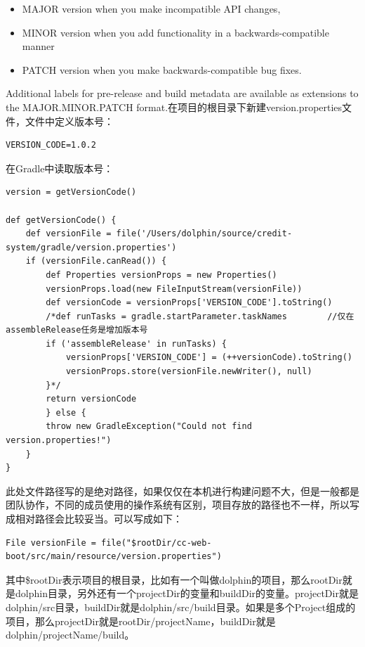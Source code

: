 \documentclass[12pt]{book}
\numberwithin{dummy}{section}
\theoremstyle{ocrenumbox}
\theoremstyle{blacknumex}
\theoremstyle{blacknumbox}
\theoremstyle{ocrenum}
\begin{document}
\begin{itemize}
	\item{MAJOR version when you make incompatible API changes,}
	\item{MINOR version when you add functionality in a backwards-compatible manner}
	\item{PATCH version when you make backwards-compatible bug fixes.}
\end{itemize}

Additional labels for pre-release and build metadata are available as extensions to the MAJOR.MINOR.PATCH format.在项目的根目录下新建version.properties文件，文件中定义版本号：

\begin{lstlisting}
VERSION_CODE=1.0.2
\end{lstlisting}

在Gradle中读取版本号：

\begin{lstlisting}
version = getVersionCode()

def getVersionCode() {
	def versionFile = file('/Users/dolphin/source/credit-system/gradle/version.properties')
	if (versionFile.canRead()) {
		def Properties versionProps = new Properties()
		versionProps.load(new FileInputStream(versionFile))
		def versionCode = versionProps['VERSION_CODE'].toString()
		/*def runTasks = gradle.startParameter.taskNames        //仅在assembleRelease任务是增加版本号
		if ('assembleRelease' in runTasks) {
			versionProps['VERSION_CODE'] = (++versionCode).toString()
			versionProps.store(versionFile.newWriter(), null)
		}*/
		return versionCode
		} else {
		throw new GradleException("Could not find version.properties!")
	}
}
\end{lstlisting}

此处文件路径写的是绝对路径，如果仅仅在本机进行构建问题不大，但是一般都是团队协作，不同的成员使用的操作系统有区别，项目存放的路径也不一样，所以写成相对路径会比较妥当。可以写成如下：

\begin{lstlisting}
File versionFile = file("$rootDir/cc-web-boot/src/main/resource/version.properties")
\end{lstlisting}

其中\$rootDir表示项目的根目录，比如有一个叫做dolphin的项目，那么rootDir就是dolphin目录，另外还有一个projectDir的变量和buildDir的变量。projectDir就是dolphin/src目录，buildDir就是dolphin/src/build目录。如果是多个Project组成的项目，那么projectDir就是rootDir/projectName，buildDir就是dolphin/projectName/build。
\end{document}
